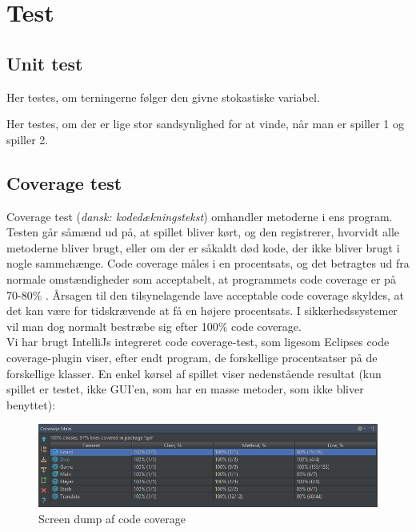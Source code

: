 \chapter{Test}

\section{Unit test}
Her testes, om terningerne følger den givne stokastiske variabel.

Her testes, om der er lige stor sandsynlighed for at vinde, når man er spiller 1 og spiller 2.

\section{Coverage test}
Coverage test (\textit{dansk: kodedækningstekst}) omhandler metoderne i ens program.
Testen går såmænd ud på, at spillet bliver kørt, og den registrerer, hvorvidt alle metoderne bliver brugt, eller om der er såkaldt død kode, der ikke bliver brugt i nogle sammehænge.
Code coverage måles i en procentsats, og det betragtes ud fra normale omstændigheder som acceptabelt, at programmets code coverage er på 70-80\% \autocite{website:steve_cornett}.
Årsagen til den tilsynelagende lave acceptable code coverage skyldes, at det kan være for tidskrævende at få en højere procentsats.
I sikkerhedssystemer vil man dog normalt bestræbe sig efter 100\% code coverage.
\\
Vi har brugt IntelliJs integreret code coverage-test, som ligesom Eclipses code coverage-plugin viser, efter endt program, de forskellige procentsatser på de forskellige klasser. En enkel kørsel af spillet viser nedenstående resultat (kun spillet er testet, ikke GUI'en, som har en masse metoder, som ikke bliver benyttet):
\begin{figure}
    \begin{center}
        \includegraphics[width=15cm]{graphics/coveragetest/coveragetest1.png}
        \caption{Screen dump af code coverage}
        \label{fig:codecoverage}
    \end{center}
\end{figure}
\\ \\
